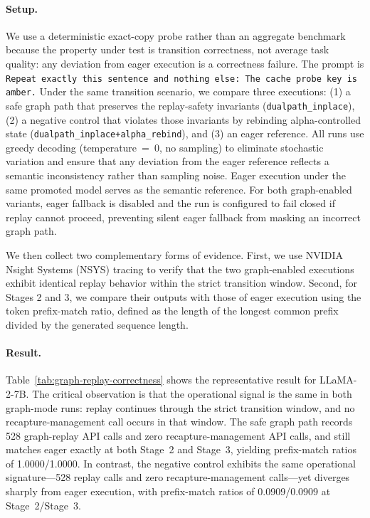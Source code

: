 \documentclass[sigplan,anonymous,review,nonacm]{acmart}
\begin{document}
\paragraph{Setup.}
We use a deterministic exact-copy probe rather than an aggregate benchmark because the property under test is transition correctness, not average task quality: any deviation from eager execution is a correctness failure. The prompt is \texttt{Repeat exactly this sentence and nothing else: The cache probe key is amber.} Under the same transition scenario, we compare three executions: (1) a safe graph path that preserves the replay-safety invariants (\texttt{dualpath\_inplace}), (2) a negative control that violates those invariants by rebinding alpha-controlled state (\texttt{dualpath\_inplace+alpha\_rebind}), and (3) an eager reference. All runs use greedy decoding (temperature~=~0, no sampling) to eliminate stochastic variation and ensure that any deviation from the eager reference reflects a semantic inconsistency rather than sampling noise. Eager execution under the same promoted model serves as the semantic reference. For both graph-enabled variants, eager fallback is disabled and the run is configured to fail closed if replay cannot proceed, preventing silent eager fallback from masking an incorrect graph path.

We then collect two complementary forms of evidence.
First, we use NVIDIA Nsight Systems (NSYS) tracing to verify that the two graph-enabled executions exhibit identical replay behavior within the strict transition window.
Second, for Stages 2 and 3, we compare their outputs with those of eager execution using the token prefix-match ratio, defined as the length of the longest common prefix divided by the generated sequence length.

\paragraph{Result.}
Table~\ref{tab:graph-replay-correctness} shows the representative result for LLaMA-2-7B. The critical observation is that the operational signal is the same in both graph-mode runs: replay continues through the strict transition window, and no recapture-management call occurs in that window. The safe graph path records 528 graph-replay API calls and zero recapture-management API calls, and still matches eager exactly at both Stage~2 and Stage~3, yielding prefix-match ratios of 1.0000/1.0000. In contrast, the negative control exhibits the same operational signature—528 replay calls and zero recapture-management calls—yet diverges sharply from eager execution, with prefix-match ratios of 0.0909/0.0909 at Stage~2/Stage~3.
\end{document}
